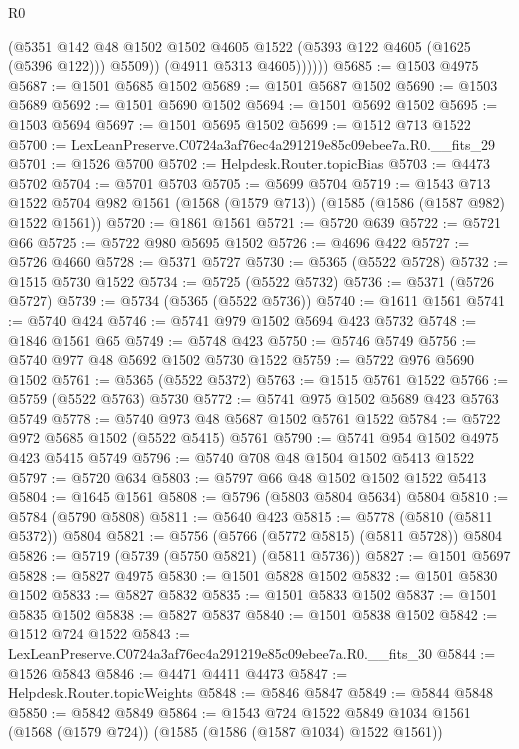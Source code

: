\begin{lexlean}{R0}
\begin{coremodule}
                (@5351
                  @142
                  @48
                  @1502
                  @1502
                  @4605
                  @1522
                  (@5393 @122 @4605 (@1625 (@5396 @122)))
                  @5509))
              (@4911 @5313 @4605))))))
@5685 := @1503 @4975
@5687 := @1501 @5685 @1502
@5689 := @1501 @5687 @1502
@5690 := @1503 @5689
@5692 := @1501 @5690 @1502
@5694 := @1501 @5692 @1502
@5695 := @1503 @5694
@5697 := @1501 @5695 @1502
@5699 := @1512 @713 @1522
@5700 := LexLeanPreserve.C0724a3af76ec4a291219e85c09ebee7a.R0.__fits_29
@5701 := @1526 @5700
@5702 := Helpdesk.Router.topicBias
@5703 := @4473 @5702
@5704 := @5701 @5703
@5705 := @5699 @5704
@5719 := @1543
    @713
    @1522
    @5704
    @982
    @1561
    (@1568 (@1579 @713))
    (@1585 (@1586 (@1587 @982) @1522 @1561))
@5720 := @1861 @1561
@5721 := @5720 @639
@5722 := @5721 @66
@5725 := @5722 @980 @5695 @1502
@5726 := @4696 @422
@5727 := @5726 @4660
@5728 := @5371 @5727
@5730 := @5365 (@5522 @5728)
@5732 := @1515 @5730 @1522
@5734 := @5725 (@5522 @5732)
@5736 := @5371 (@5726 @5727)
@5739 := @5734 (@5365 (@5522 @5736))
@5740 := @1611 @1561
@5741 := @5740 @424
@5746 := @5741 @979 @1502 @5694 @423 @5732
@5748 := @1846 @1561 @65
@5749 := @5748 @423
@5750 := @5746 @5749
@5756 := @5740 @977 @48 @5692 @1502 @5730 @1522
@5759 := @5722 @976 @5690 @1502
@5761 := @5365 (@5522 @5372)
@5763 := @1515 @5761 @1522
@5766 := @5759 (@5522 @5763) @5730
@5772 := @5741 @975 @1502 @5689 @423 @5763 @5749
@5778 := @5740 @973 @48 @5687 @1502 @5761 @1522
@5784 := @5722 @972 @5685 @1502 (@5522 @5415) @5761
@5790 := @5741 @954 @1502 @4975 @423 @5415 @5749
@5796 := @5740 @708 @48 @1504 @1502 @5413 @1522
@5797 := @5720 @634
@5803 := @5797 @66 @48 @1502 @1502 @1522 @5413
@5804 := @1645 @1561
@5808 := @5796 (@5803 @5804 @5634) @5804
@5810 := @5784 (@5790 @5808)
@5811 := @5640 @423
@5815 := @5778 (@5810 (@5811 @5372)) @5804
@5821 := @5756 (@5766 (@5772 @5815) (@5811 @5728)) @5804
@5826 := @5719 (@5739 (@5750 @5821) (@5811 @5736))
@5827 := @1501 @5697
@5828 := @5827 @4975
@5830 := @1501 @5828 @1502
@5832 := @1501 @5830 @1502
@5833 := @5827 @5832
@5835 := @1501 @5833 @1502
@5837 := @1501 @5835 @1502
@5838 := @5827 @5837
@5840 := @1501 @5838 @1502
@5842 := @1512 @724 @1522
@5843 := LexLeanPreserve.C0724a3af76ec4a291219e85c09ebee7a.R0.__fits_30
@5844 := @1526 @5843
@5846 := @4471 @4411 @4473
@5847 := Helpdesk.Router.topicWeights
@5848 := @5846 @5847
@5849 := @5844 @5848
@5850 := @5842 @5849
@5864 := @1543
    @724
    @1522
    @5849
    @1034
    @1561
    (@1568 (@1579 @724))
    (@1585 (@1586 (@1587 @1034) @1522 @1561))

\end{coremodule}
\end{lexlean}
